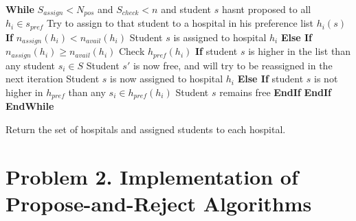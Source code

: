 \documentclass{article}
\begin{document}
\textbf{While} $S_{assign}<N_{pos}$ and $S_{check}<n$ and student $s$ hasnt proposed to all $h_i \in s_{pref}$\newline
 Try to assign to that student to a hospital in his preference list $h_i(s)$\newline
 \textbf{If} $n_{assign} (h_i) < n_{avail} (h_i)$\newline
  Student $s$ is assigned to hospital $h_i$\newline
 \textbf{Else If} $n_{assign} (h_i) \geq n_{avail} (h_i)$\newline
  Check $h_{pref} (h_i)$\newline
  \textbf{If} student $s$ is higher in the list than any student $s_i \in S$\newline
   Student $s'$ is now free, and will try to be reassigned in the next iteration\newline
   Student $s$ is now assigned to hospital $h_i$\newline
  \textbf{Else If} student $s$ is not higher in $h_{pref}$ than any $s_i \in h_{pref} (h_i)$\newline
   Student $s$ remains free\newline
\textbf{EndIf}
\textbf{EndIf}
\textbf{EndWhile}

Return the set of hospitals and assigned students to each hospital.
  

\section*{Problem 2. Implementation of Propose-and-Reject Algorithms}
\end{document}
